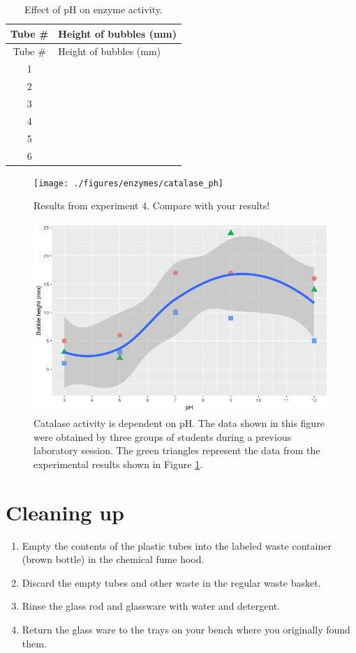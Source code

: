 \begin{longtable}[]{@{}cl@{}}
\caption{\label{tab:pH} Effect of pH on enzyme activity.}\tabularnewline
\toprule
Tube \# & Height of bubbles (mm)\tabularnewline
\midrule
\endfirsthead
\toprule
Tube \# & Height of bubbles (mm)\tabularnewline
\midrule
\endhead
1 &\tabularnewline
2 &\tabularnewline
3 &\tabularnewline
4 &\tabularnewline
5 &\tabularnewline
6 &\tabularnewline
\bottomrule
\end{longtable}

\begin{figure}

{\centering \texttt{[image: ./figures/enzymes/catalase\_ph]} 

}

\caption{Results from experiment 4. Compare with your results!}\label{fig:pH}
\end{figure}






\begin{figure}

{\centering \includegraphics[width=0.75\linewidth]{./figures/enzymes/activity-1} 

}

\caption{Catalase activity is dependent on pH. The data shown in this
figure were obtained by three groups of students during a previous
laboratory session. The green triangles represent the data from the
experimental results shown in Figure \ref{fig:pH}.}\label{fig:activity}
\end{figure}

\section{Cleaning up}\label{cleaning-up-5}

\begin{enumerate}
\def\labelenumi{\arabic{enumi}.}
\tightlist
\item
  Empty the contents of the plastic tubes into the labeled waste
  container (brown bottle) in the chemical fume hood.
\item
  Discard the empty tubes and other waste in the regular waste basket.
\item
  Rinse the glass rod and glassware with water and detergent.
\item
  Return the glass ware to the trays on your bench where you originally
  found them.
\end{enumerate}

